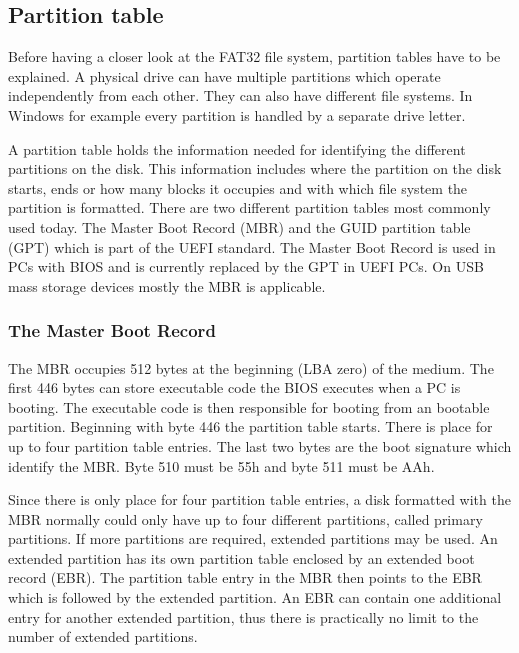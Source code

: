 \subsection{Partition table}

Before having a closer look at the FAT32 file system, partition tables have to be explained. A physical drive can have multiple partitions which operate independently from each other. They can also have different file systems. In Windows for example every partition is handled by a separate drive letter.

A partition table holds the information needed for identifying the different partitions on the disk. This information includes where the partition on the disk starts, ends or how many blocks it occupies and with which file system the partition is formatted. There are two different partition tables most commonly used today. The Master Boot Record (MBR) and the GUID partition table (GPT) which is part of the UEFI standard\cite{wiki_guid}. The Master Boot Record is used in PCs with BIOS and is currently replaced by the GPT in UEFI PCs. On USB mass storage devices mostly the MBR is applicable. 

\subsubsection{The Master Boot Record}

The MBR occupies 512 bytes at the beginning (LBA zero) of the medium. The first 446 bytes can store executable code the BIOS executes when a PC is booting. The executable code is then responsible for booting from an bootable partition. Beginning with byte 446 the partition table starts. There is place for up to four partition table entries. The last two bytes are the boot signature which identify the MBR. Byte 510 must be 55h and byte 511 must be AAh\cite{fat_paul}.

Since there is only place for four partition table entries, a disk formatted with the MBR normally could only have up to four different partitions, called primary partitions. If more partitions are required, extended partitions may be used. An extended partition has its own partition table enclosed by an extended boot record (EBR). The partition table entry in the MBR then points to the EBR which is followed by the extended partition. An EBR can contain one additional entry for another extended partition, thus there is practically no limit to the number of extended partitions\cite{usb_ms_jan}.

